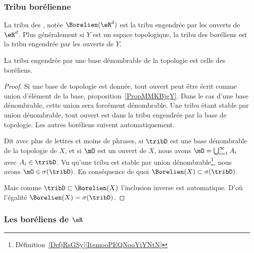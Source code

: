 \subsubsection{Tribu borélienne}

\begin{definition}
    La tribu des , notée \( \Borelien(\eR^d)\) est la tribu engendrée par les ouverts de \( \eR^d\). Plus généralement si \( Y\) est un espace topologique, la tribu des boréliens est la tribu engendrée par les ouverts de \( Y\).
\end{definition}

\begin{proposition} \label{PROPooYEkvbWBz}
    La tribu engendrée par une base dénombrable de la topologie est celle des boréliens.
\end{proposition}

\begin{proof}
    Si une base de topologie est donnée, tout ouvert peut être écrit comme union d'élément de la base, proposition~\ref{PropMMKBjgY}. Dans le cas d'une base dénombrable, cette union sera forcément dénombrable. Une tribu étant stable par union dénombrable, tout ouvert est dans la tribu engendrée par la base de topologie. Les autres boréliens suivent automatiquement.

    Dit avec plus de lettres et moins de phrases, si \( \tribD\) est une base dénombrable de la topologie de \( X\), et si \( \mO\) est un ouvert de \( X\), nous avons \( \mO=\bigcup_{i=1}^{\infty}A_i\) avec \( A_i\in\tribD\). Vu qu'une tribu est stable par union dénombrable\footnote{Définition~\ref{DefjRsGSy}\ref{ItemooPEQNooYiYNtN}}, nous avons \( \mO\in\sigma(\tribD)\). En conséquence de quoi \( \Borelien(X)\subset\sigma(\tribD)\).

    Mais comme \( \tribD\subset\Borelien(X)\) l'inclusion inverse est automatique. D'où l'égalité \( \Borelien(X)=\sigma(\tribD)\).
\end{proof}

\subsubsection{Les boréliens de \texorpdfstring{$ \eR$}{R}}

